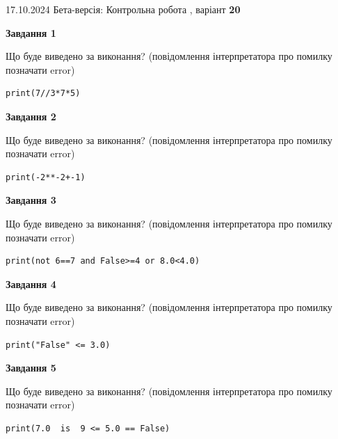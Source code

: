 \documentclass[12pt, ukrainian]{article}
\begin{document}
{\Large{17.10.2024 Бета-версія: Контрольна робота , варіант  \No \textbf { 20 }\par}}
{
\begin {large}
{\begin {center}\textbf{Завдання 1}\end {center}}

Що буде виведено за виконання? (повідомлення інтерпретатора про помилку позначати error)\par
\begin{verbatim}
print(7//3*7*5)
\end{verbatim}

{\begin {center}\textbf{Завдання 2}\end {center}}

Що буде виведено за виконання? (повідомлення інтерпретатора про помилку позначати error)\par
\begin{verbatim}
print(-2**-2+-1)
\end{verbatim}

{\begin {center}\textbf{Завдання 3}\end {center}}

Що буде виведено за виконання? (повідомлення інтерпретатора про помилку позначати error)\par
\begin{verbatim}
print(not 6==7 and False>=4 or 8.0<4.0)
\end{verbatim}

{\begin {center}\textbf{Завдання 4}\end {center}}

Що буде виведено за виконання? (повідомлення інтерпретатора про помилку позначати error)\par
\begin{verbatim}
print("False" <= 3.0)
\end{verbatim}

{\begin {center}\textbf{Завдання 5}\end {center}}

Що буде виведено за виконання? (повідомлення інтерпретатора про помилку позначати error)\par
\begin{verbatim}
print(7.0  is  9 <= 5.0 == False)
\end{verbatim}


\end{large}}
\end{document}
